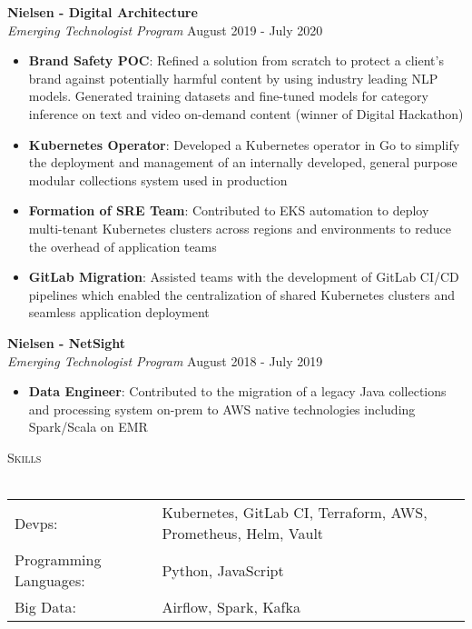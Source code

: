 \documentclass[a4paper]{article}
\newcommand{\lineunder} {
    \vspace*{-8pt} \\
    \hspace*{-18pt} \hrulefill \\
}
\newcommand{\header} [1] {
    {\hspace*{-18pt}\vspace*{6pt} \textsc{#1}}
    \vspace*{-6pt} \lineunder
}
\begin{document}
\textbf{Nielsen - Digital Architecture}\\
\textit{Emerging Technologist Program} \hfill August 2019 - July 2020\\
\vspace{-1mm}
\begin{itemize} \itemsep 1pt
	\item \textbf{Brand Safety POC}: Refined a solution from scratch to protect a client's brand against potentially harmful content by using industry leading NLP models. Generated training datasets and fine-tuned models for category inference on text and video on-demand content (winner of Digital Hackathon)
    \item \textbf{Kubernetes Operator}: Developed a Kubernetes operator in Go to simplify the deployment and management of an internally developed, general purpose modular collections system used in production
    \item \textbf{Formation of SRE Team}: Contributed to EKS automation to deploy multi-tenant Kubernetes clusters across regions and environments to reduce the overhead of application teams
    \item \textbf{GitLab Migration}: Assisted teams with the development of GitLab CI/CD pipelines which enabled the centralization of shared Kubernetes clusters and seamless application deployment
\end{itemize}

\textbf{Nielsen - NetSight}\\
\textit{Emerging Technologist Program} \hfill August 2018 - July 2019\\
\vspace{-1mm}
\begin{itemize} \itemsep 1pt
	\item \textbf{Data Engineer}: Contributed to the migration of a legacy Java collections and processing system on-prem to AWS native technologies including Spark/Scala on EMR
\end{itemize}

\header{Skills}
\vspace*{1mm}
\begin{tabular}{ l l }
	Devps:                & Kubernetes, GitLab CI, Terraform, AWS, Prometheus, Helm, Vault         \\
	Programming Languages: & Python, JavaScript                                                     \\
	Big Data:              & Airflow, Spark, Kafka                                                  \\
\end{tabular}
\vspace{3mm}
\end{document}
